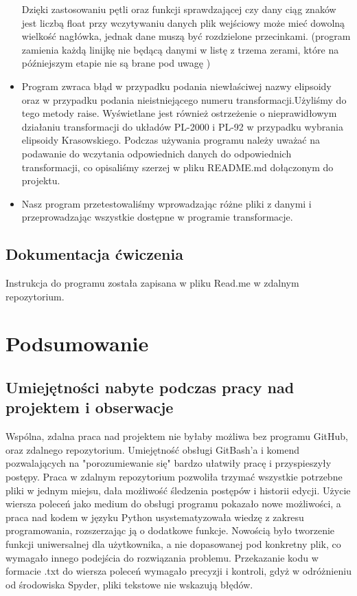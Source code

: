 \documentclass[10pt,a4paper]{article}
\begin{document}
\begin{itemize}
	Dzięki zastosowaniu pętli oraz funkcji sprawdzającej czy dany ciąg znaków jest liczbą float przy wczytywaniu danych plik wejściowy może mieć dowolną wielkość nagłówka, jednak dane muszą być rozdzielone przecinkami. (program zamienia każdą linijkę nie będącą danymi w listę z trzema zerami, które na późniejszym etapie nie są brane pod uwagę )
	\item Program zwraca błąd w przypadku podania niewłaściwej nazwy elipsoidy oraz w przypadku podania nieistniejącego numeru transformacji.Użyliśmy do tego metody raise. Wyświetlane jest również ostrzeżenie o nieprawidłowym działaniu transformacji do układów PL-2000 i PL-92 w przypadku wybrania elipsoidy Krasowskiego. Podczas używania programu należy uważać na podawanie do wczytania odpowiednich danych do odpowiednich transformacji, co opisaliśmy szerzej w pliku README.md dołączonym do projektu.
	\item Nasz program przetestowaliśmy wprowadzając różne pliki z danymi i przeprowadzając wszystkie dostępne w programie transformacje.
\end{itemize}
\subsection{Dokumentacja ćwiczenia}
Instrukcja do programu została zapisana w pliku Read.me w zdalnym repozytorium.
\section{Podsumowanie}
\subsection{Umiejętności nabyte podczas pracy nad projektem i obserwacje}
Wspólna, zdalna praca nad projektem nie byłaby możliwa bez programu GitHub, oraz zdalnego repozytorium. Umiejętność obsługi GitBash'a i komend pozwalających na "porozumiewanie się" bardzo ułatwiły pracę i przyspieszyły postępy. Praca w zdalnym repozytorium pozwoliła trzymać wszystkie potrzebne pliki w jednym miejsu, dała możliwość śledzenia postępów i historii edycji.
\newline 
Użycie wiersza poleceń jako medium do obsługi programu pokazało nowe możliwości, a praca nad kodem w języku Python usystematyzowała wiedzę z zakresu programowania, rozszerzając ją o dodatkowe funkcje. Nowością było tworzenie funkcji uniwersalnej dla użytkownika, a nie dopasowanej pod konkretny plik, co wymagało innego podejścia do rozwiązania problemu. Przekazanie kodu w formacie .txt do wiersza poleceń wymagało precyzji i kontroli, gdyż w odróżnieniu od środowiska Spyder, pliki tekstowe nie wskazują błędów.
\end{document}
